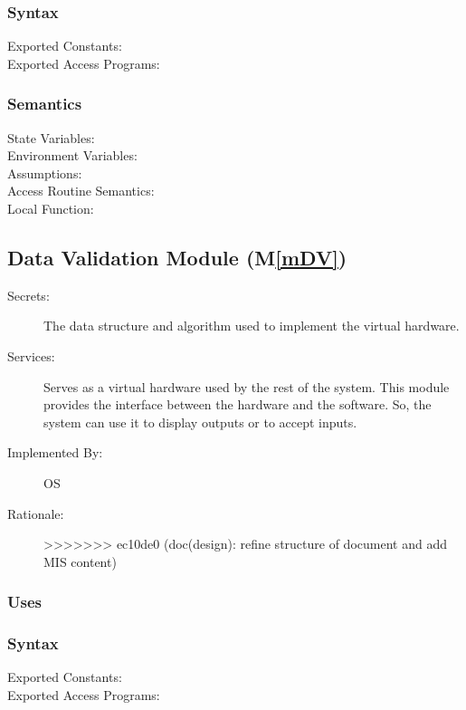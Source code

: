 \documentclass[12pt, titlepage]{article}
\newcommand{\mref}[1]{M\ref{#1}}
\begin{document}
\begin{description}
\begin{description}
\subsubsection{Syntax}
\begin{description}
  \item[Exported Constants:] 
  \item[Exported Access Programs:] 
\end{description}

\subsubsection{Semantics}
\begin{description}
  \item[State Variables:]
  \item[Environment Variables:]  
  \item[Assumptions:] 
  \item[Access Routine Semantics:] 
  \item[Local Function:] 
\end{description}

\subsection{Data Validation Module (\mref{mDV})}
\begin{description}
  \item[Secrets:]The data structure and algorithm used to implement the virtual
    hardware.
  \item[Services:]Serves as a virtual hardware used by the rest of the
    system. This module provides the interface between the hardware and the
    software. So, the system can use it to display outputs or to accept inputs.
  \item[Implemented By:] OS
  \item[Rationale:] 
>>>>>>> ec10de0 (doc(design): refine structure of document and add MIS content)
\end{description}

\subsubsection{Uses}

\subsubsection{Syntax}
\begin{description}
  \item[Exported Constants:] 
  \item[Exported Access Programs:] 
\end{description}


\end{description}
\end{description}
\end{document}
